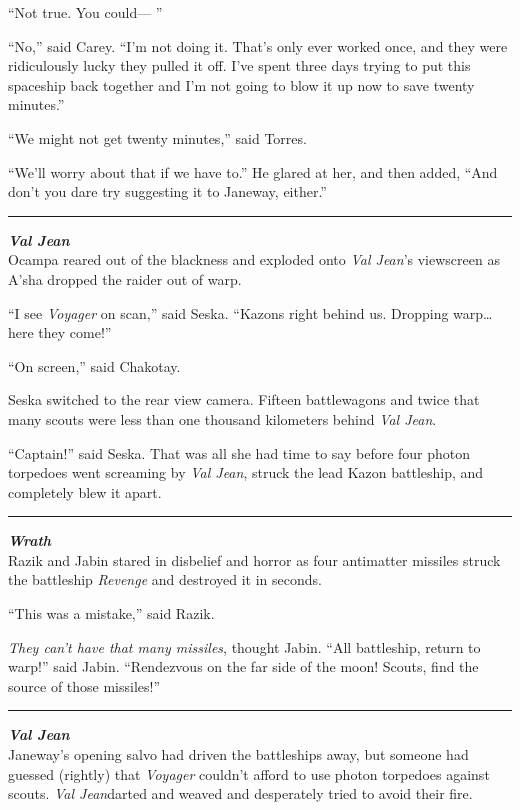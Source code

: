 \documentclass[twoside,letterpaper,12pt]{memoir}
\begin{document}
``Not true. You could--- ''

``No,'' said Carey. ``I’m not doing it. That’s only ever worked once, and they were ridiculously lucky they pulled it off. I’ve spent three days trying to put this spaceship back together and I’m not going to blow it up now to save twenty minutes.''

``We might not get twenty minutes,'' said Torres.

``We’ll worry about that if we have to.'' He glared at her, and then added, ``And don't you dare try suggesting it to Janeway, either.''

\fancybreak{\rule{3cm}{0.4 pt}}
\noindent\textit{\textbf{Val Jean}}\\

Ocampa reared out of the blackness and exploded onto \textit{Val Jean}'s viewscreen as A'sha dropped the raider out of warp.

``I see \textit{Voyager} on scan,'' said Seska. ``Kazons right behind us. Dropping warp\ldots here they come!''

``On screen,'' said Chakotay.

Seska switched to the rear view camera. Fifteen battlewagons and twice that many scouts were less than one thousand kilometers behind \textit{Val Jean}.

``Captain!'' said Seska. That was all she had time to say before four photon torpedoes went screaming by \textit{Val Jean}, struck the lead Kazon battleship, and completely blew it apart.

\fancybreak{\rule{3cm}{0.4 pt}}
\noindent\textit{\textbf{Wrath}}\\

Razik and Jabin stared in disbelief and horror as four antimatter missiles struck the battleship \textit{Revenge} and destroyed it in seconds.

``This was a mistake,'' said Razik.

\textit{They can't have that many missiles}, thought Jabin. ``All battleship, return to warp!'' said Jabin. ``Rendezvous on the far side of the moon! Scouts, find the source of those missiles!''

\fancybreak{\rule{3cm}{0.4 pt}}
\noindent\textit{\textbf{Val Jean}}\\

Janeway's opening salvo had driven the battleships away, but someone had guessed (rightly) that \textit{Voyager} couldn't afford to use photon torpedoes against scouts. \textit{Val Jean}darted and weaved and desperately tried to avoid their fire.
\end{document}
